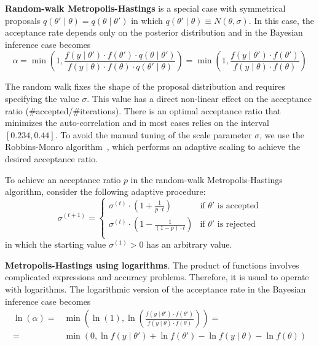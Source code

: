 \documentclass[11pt,fleqn]{book} %
\begin{document}
\textbf{Random-walk Metropolis-Hastings} is a special case with symmetrical 
proposals $q(\theta' \mid \theta) = q(\theta \mid \theta')$ in which 
$q(\theta' \mid \theta) \equiv N(\theta,\sigma)$. 
In this case, the acceptance rate depends only on the posterior distribution
and in the Bayesian inference case becomes
\begin{displaymath}
	\alpha = 
	\min\left(1,\frac{f(y \mid \theta') \cdot f(\theta') \cdot q(\theta \mid \theta')}{f(y \mid \theta)  \cdot f(\theta) \cdot q(\theta' \mid \theta)}\right) = 
	\min\left(1,\frac{f(y \mid \theta') \cdot f(\theta')}{f(y \mid \theta) \cdot f(\theta)}\right)
\end{displaymath}

The random walk fixes the shape of the proposal distribution and requires 
specifying the value $\sigma$. This value has a direct non-linear effect 
on the acceptance ratio (\#accepted/\#iterations). There is an optimal 
acceptance ratio that minimizes the auto-correlation and in most cases 
relies on the interval $[0.234,0.44]$. To avoid the  manual tuning of the 
scale parameter $\sigma$, we use the Robbins-Monro algorithm~\cite{garthwaite:2010}, 
which performs an adaptive scaling to achieve the desired acceptance ratio.

\begin{proposition}
	To achieve an acceptance ratio $p$ in the random-walk 
	Metropolis-Hastings algorithm, consider the following adaptive
	procedure:
	\begin{displaymath}
		\sigma^{(t+1)} = \left\{
		\begin{array}{ll}
			\sigma^{(t)} \cdot \left( 1 + \frac{1}{p \cdot t} \right) & \text{if $\theta'$ is accepted} \\
			\sigma^{(t)} \cdot \left( 1 - \frac{1}{(1-p) \cdot t} \right) & \text{if $\theta'$ is rejected} \\
		\end{array}
		\right.
	\end{displaymath}
	in which the starting value $\sigma^{(1)} > 0$ has an arbitrary value.
\end{proposition}

\textbf{Metropolis-Hastings using logarithms}.
The product of functions involves complicated expressions and accuracy 
problems. Therefore, it is usual to operate with logarithms. The 
logarithmic version of the acceptance rate in the Bayesian inference 
case becomes
\begin{displaymath}
	\begin{array}{rl}
		\ln(\alpha) = & \min \left( \ln(1),  
		\ln \left(\frac{f(y \mid \theta') \cdot f(\theta')}{f(y \mid \theta) \cdot f(\theta)}\right)
		\right) = \\
		= & \min \left( 0,
		\ln f(y \mid \theta') + \ln f(\theta') - \ln f(y \mid \theta) - \ln f(\theta)
		\right)
	\end{array}
\end{displaymath}
\end{document}

